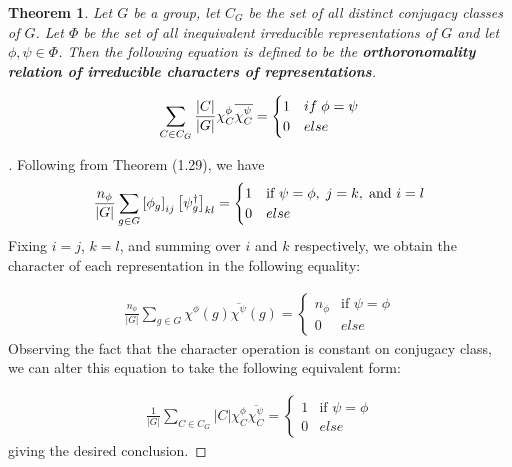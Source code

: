 \documentclass[10pt]{ucthesis}
\newtheorem{theorem}[definition]{Theorem}
\begin{document}
\begin{theorem}
	Let $G$ be a group, let $C_G$ be the set of all distinct conjugacy classes of $G$. Let $\Phi$ be the set of all inequivalent irreducible representations of $G$ and let $\phi,\psi\in\Phi$. Then the following equation is defined to be the \textbf{orthoronomality relation of irreducible characters of representations}.

$$\sum_{C \in C_G} \frac{|C|}{|G|} \chi^{\phi}_C \overline{\chi^{\psi}_C } = \begin{cases}
																1 & if \hspace{1mm} \phi = \psi \\
																0 & else
															\end{cases}$$
\end{theorem}
\noindent \begin{proof}[\cite{Tung}] Following from Theorem (1.29), we have 
$$\frac{n_\phi}{|G|} \sum_{g\in G} \left[\phi_g \right]_{ij} \left[\psi_g^\dag \right]_{kl} = \begin{cases}
																						1 & \text{if } \psi = \phi,\hspace{1mm} j=k,\hspace{1mm} \text{and } i=l\\
																						0 & else
																					 \end{cases}$$
Fixing $i=j$, $k=l$, and summing over $i$ and $k$ respectively, we obtain the character of each representation in the following equality:

\begin{equation}
	\begin{aligned}
		\frac{n_\phi}{|G|} \sum_{g\in G} \chi^\phi(g) \overline{\chi^\psi}(g) = \begin{cases}
																						n_\phi & \text{if } \psi = \phi \\
																						0 & else
																					 \end{cases}
	\end{aligned}
\end{equation}
Observing the fact that the character operation is constant on conjugacy class, we can alter this equation to take the following equivalent form:

\begin{equation}
	\begin{aligned}
		\frac{1}{|G|} \sum_{C\in C_G} |C| \chi^\phi_C \overline{\chi^\psi_C}= \begin{cases}
																						1 & \text{if } \psi = \phi \\
																						0 & else
																					 \end{cases}
	\end{aligned}
\end{equation}
giving the desired conclusion.  \end{proof}
\end{document}
